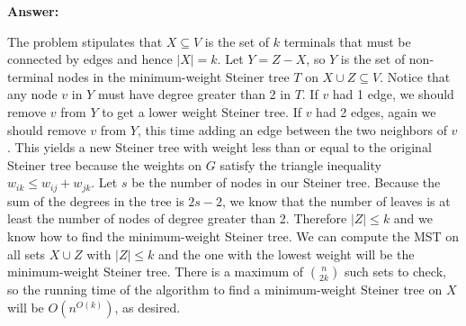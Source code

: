 \documentclass[11pt]{article}
\newcommand\answer{\vspace{.10in}\textbf{Answer: }}
\begin{document}
\answer

The problem stipulates that $X \subseteq V$ is the set of $k$ terminals that must be connected by edges and hence $|X| = k$. Let $Y = Z - X$, so $Y$ is the set of non-terminal nodes in the minimum-weight Steiner tree $T$ on $X \cup Z \subseteq V$. Notice that any node $v$ in $Y$ must have degree greater than 2 in $T$. If $v$ had 1 edge, we should remove $v$ from $Y$ to get a lower weight Steiner tree. If $v$ had 2 edges, again we should remove $v$ from $Y$, this time adding an edge between the two neighbors of $v$. This yields a new Steiner tree with weight less than or equal to the original Steiner tree because the weights on $G$ satisfy the triangle inequality $w_{ik} \leq w_{ij} + w_{jk}$. Let $s$ be the number of nodes in our Steiner tree. Because the sum of the degrees in the tree is $2s - 2$, we know that the number of leaves is at least the number of nodes of degree greater than 2. Therefore $|Z| \leq k$ and we know how to find the minimum-weight Steiner tree. We can compute the MST on all sets $X \cup Z$ with $|Z| \leq k$ and the one with the lowest weight will be the minimum-weight Steiner tree. There is a maximum of ${n \choose 2k}$ such sets to check, so the running time of the algorithm to find a minimum-weight Steiner tree on $X$ will be $O(n^{O(k)})$, as desired.

\clearpage
\end{document}
